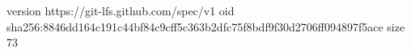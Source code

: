 version https://git-lfs.github.com/spec/v1
oid sha256:8846dd164c191c44bf84c9cff5c363b2dfc75f8bdf9f30d2706ff094897f5ace
size 73
